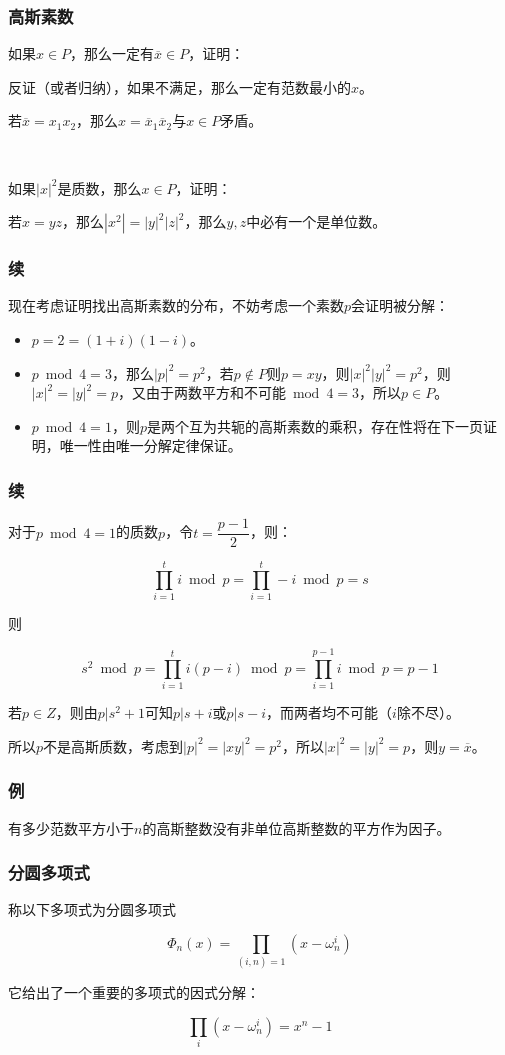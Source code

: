 \documentclass[10pt]{beamer}
\begin{document}
	\begin{frame}
		\frametitle{高斯素数}
	
		如果$x\in P$，那么一定有$\overline x\in P$，证明：
			
		反证（或者归纳），如果不满足，那么一定有范数最小的$x$。

		若$\overline x=x_1x_2$，那么$x=\overline x_1\overline x_2$与$x\in P$矛盾。

		$ $

		如果$|x|^2$是质数，那么$x\in P$，证明：

		若$x=yz$，那么$|x^2|=|y|^2|z|^2$，那么$y,z$中必有一个是单位数。

	\end{frame}
	\begin{frame}
		\frametitle{续}
	
		现在考虑证明找出高斯素数的分布，不妨考虑一个素数$p$会证明被分解：

		\begin{itemize}
			\item $p=2=(1+i)(1-i)$。
			\item $p\bmod 4=3$，那么$|p|^2=p^2$，若$p\not\in P$则$p=xy$，则$|x|^2|y|^2=p^2$，则$|x|^2=|y|^2=p$，又由于两数平方和不可能$\bmod 4=3$，所以$p\in P$。
			\item $p\bmod 4=1$，则$p$是两个互为共轭的高斯素数的乘积，存在性将在下一页证明，唯一性由唯一分解定律保证。
		\end{itemize}
	\end{frame}
	\begin{frame}
		\frametitle{续}
	
		对于$p\bmod 4=1$的质数$p$，令$t=\dfrac{p-1}2$，则：

		$$
		\prod_{i=1}^t i \bmod p=\prod_{i=1}^t -i \bmod p=s
		$$

		则

		$$
		s^2 \bmod p=\prod_{i=1}^{t}i(p-i) \bmod p=\prod_{i=1}^{p-1} i \bmod p=p-1
		$$

		若$p\in Z$，则由$p|s^2+1$可知$p|s+i$或$p|s-i$，而两者均不可能（$i$除不尽）。

		所以$p$不是高斯质数，考虑到$|p|^2=|xy|^2=p^2$，所以$|x|^2=|y|^2=p$，则$y=\overline x$。
	
	\end{frame}
	\begin{frame}
		\frametitle{例}

		有多少范数平方小于$n$的高斯整数没有非单位高斯整数的平方作为因子。
	
	\end{frame}
	\begin{frame}
		\frametitle{分圆多项式}
	
		称以下多项式为分圆多项式
		
		$$
		\Phi_n(x)=\prod_{(i,n)=1}(x-\omega_n^i)
		$$

		它给出了一个重要的多项式的因式分解：

		$$
		\prod_i (x-\omega_n^i)=x^n-1
		$$
	
	\end{frame}
\end{document}
